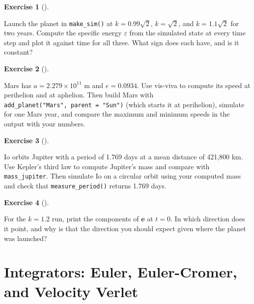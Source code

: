 \documentclass[
  10.5pt,
  letterpaper,
]{scrbook}
\theoremstyle{definition}
\newtheorem{exercise}{Exercise}[chapter]
\theoremstyle{plain}
\theoremstyle{remark}
\begin{document}
\begin{exercise}[]\protect\hypertarget{exr-ch4-escape}{}\label{exr-ch4-escape}

Launch the planet in \texttt{make\_sim()} at \(k = 0.99\sqrt{2}\),
\(k = \sqrt{2}\), and \(k = 1.1\sqrt{2}\) for two years. Compute the
specific energy \(\varepsilon\) from the simulated state at every time
step and plot it against time for all three. What sign does each have,
and is it constant?

\end{exercise}

\begin{exercise}[]\protect\hypertarget{exr-ch4-perihelion-speed}{}\label{exr-ch4-perihelion-speed}

Mars has \(a = 2.279\times10^{11}\) m and \(e = 0.0934\). Use vis-viva
to compute its speed at perihelion and at aphelion. Then build Mars with
\texttt{add\_planet("Mars",\ parent\ =\ "Sun")} (which starts it at
perihelion), simulate for one Mars year, and compare the maximum and
minimum speeds in the output with your numbers.

\end{exercise}

\begin{exercise}[]\protect\hypertarget{exr-ch4-weigh}{}\label{exr-ch4-weigh}

Io orbits Jupiter with a period of 1.769 days at a mean distance of
421,800 km. Use Kepler's third law to compute Jupiter's mass and compare
with \texttt{mass\_jupiter}. Then simulate Io on a circular orbit using
your computed mass and check that \texttt{measure\_period()} returns
1.769 days.

\end{exercise}

\begin{exercise}[]\protect\hypertarget{exr-ch4-e-vector-direction}{}\label{exr-ch4-e-vector-direction}

For the \(k = 1.2\) run, print the components of \(\mathbf{e}\) at
\(t = 0\). In which direction does it point, and why is that the
direction you should expect given where the planet was launched?

\end{exercise}

\chapter{Integrators: Euler, Euler-Cromer, and Velocity
Verlet}\label{sec-integrators}
\end{document}

